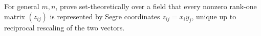 \begin{problem}\label{chal:vi36-04}
For general \(m,n\), prove set-theoretically over a field that every nonzero rank-one matrix \((z_{ij})\) is represented by Segre coordinates \(z_{ij}=x_i y_j\), unique up to reciprocal rescaling of the two vectors.
\end{problem}
